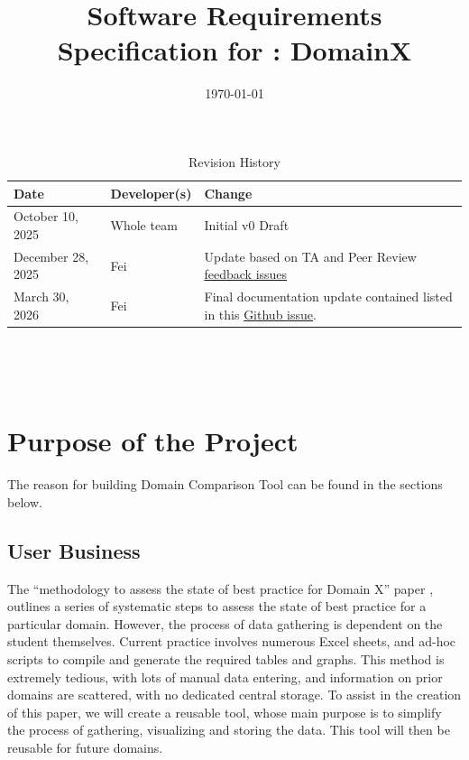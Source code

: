 \documentclass[12pt]{article}
\begin{document}
\title{Software Requirements Specification for \progname: DomainX}
\author{\authname}
\date{\today}

\maketitle

\begin{table}[hp]
\caption{Revision History} \label{TblRevisionHistory}
\begin{tabularx}{\textwidth}{llX}
\toprule
\textbf{Date} & \textbf{Developer(s)} & \textbf{Change}\\
\midrule
October 10, 2025 & Whole team & Initial v0 Draft\\
\midrule
December 28, 2025 & Fei & Update based on TA and Peer Review \href{https://github.com/thaafei/DomainX/pull/254}{feedback issues}\\
March 30, 2026 & Fei & Final documentation update contained listed in this \href{https://github.com/thaafei/DomainX/issues/520}{Github issue}.\\
\bottomrule
\end{tabularx}
\end{table}

~\newpage

\tableofcontents

~\newpage
{}

\section{Purpose of the Project}
The reason for building Domain Comparison Tool can be found in the sections below.
\subsection{User Business}
The “methodology to assess the state of best practice for Domain X” paper \cite{MethodologyPaper}, outlines a series of systematic steps to assess the state of best practice for a particular domain.
However, the process of data gathering is dependent on the student themselves. Current practice involves numerous Excel sheets, and ad-hoc scripts to compile and generate the required tables and graphs.
This method is extremely tedious, with lots of manual data entering, and information on prior domains are scattered, with no dedicated central storage.
To assist in the creation of this paper, we will create a reusable tool, whose main purpose is to simplify the process of gathering, visualizing and storing the data. This tool will then be reusable for future domains.
\end{document}
